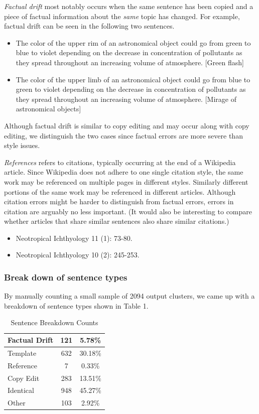 \documentclass{acm_proc_article-sp}
\begin{document}
\emph{Factual drift} most notably occurs when the same sentence has been copied and a piece of factual information about the \emph{same} topic has changed. For example, factual drift can be seen in the following two sentences.
\begin{itemize}[noitemsep,nolistsep]
\item The color of the upper rim of an astronomical object could go from green to blue to violet depending on the decrease in concentration of pollutants as they spread throughout an increasing volume of atmosphere. [Green flash]
\item The color of the upper limb of an astronomical object could go from blue to green to violet depending on the decrease in concentration of pollutants as they spread throughout an increasing volume of atmosphere. [Mirage of astronomical objects]
\end{itemize}
Although factual drift is similar to copy editing and may occur along with copy editing, we distinguish the two cases since factual errors are more severe than style issues.

\emph{References} refers to citations, typically occurring at the end of a Wikipedia article. Since Wikipedia does not adhere to one single citation style, the same work may be referenced on multiple pages in different styles. Similarly different portions of the same work may be referenced in different articles. Although citation errors might be harder to distinguish from factual errors, errors in citation are arguably no less important. (It would also be interesting to compare whether articles that share similar sentences also share similar citations.) 

\begin{itemize}[noitemsep,nolistsep]
\item Neotropical Ichthyology 11 (1): 73-80.
\item Neotropical Ichthyology 10 (2): 245-253.
\end{itemize}

\subsubsection{Break down of sentence types}

By manually counting a small sample of 2094 output clusters, we came up with a breakdown of sentence types shown in Table 1.

\begin{table}
\centering
\caption{Sentence Breakdown Counts}
\begin{tabular}{| l | c | c |}
\hline
Factual Drift & 121 & 5.78\% \\ \hline
Template & 632 & 30.18\% \\ \hline
Reference & 7 & 0.33\% \\ \hline      
Copy Edit & 283 & 13.51\% \\ \hline
Identical & 948 & 45.27\% \\ \hline
Other & 103 & 2.92\% \\ \hline
\hline
\end{tabular}
\end{table}
\end{document}

